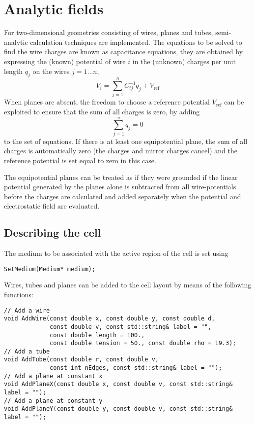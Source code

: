 \section{Analytic fields}

For two-dimensional geometries consisting of wires, planes and tubes, 
semi-analytic calculation techniques are implemented. 
The equations to be solved to find the wire charges are known as 
capacitance equations, they are obtained by expressing the (known) 
potential of wire $i$ in the (unknown) charges per unit length $q_j$ 
on the wires $j = 1 \dots n$,
\begin{equation*}
V_{i} = \sum\limits_{j=1}^{n} C_{ij}^{-1}q_{j} + V_{\text{ref}} 
\end{equation*}
When planes are absent, the freedom to choose a reference potential 
$V_{\text{ref}}$ can be exploited to ensure that the sum of all 
charges is zero, by adding 
\begin{equation*}
\sum\limits_{j=1}^{n} q_{j} = 0
\end{equation*}
to the set of equations.
If there is at least one equipotential plane, the sum of all charges 
is automatically zero (the charges and mirror charges cancel) and 
the reference potential is set equal to zero in this case.

The equipotential planes can be treated as if they were grounded 
if the linear potential generated by the planes alone is subtracted 
from all wire-potentials before the charges are calculated and 
added separately when the potential and electrostatic field are evaluated.

\subsection{Describing the cell}
The medium to be associated with the active region of the cell 
is set using
\begin{lstlisting}
SetMedium(Medium* medium);
\end{lstlisting}
Wires, tubes and planes can be added to the cell layout by means of the 
following functions:
\begin{lstlisting}
// Add a wire
void AddWire(const double x, const double y, const double d,
             const double v, const std::string& label = "", 
             const double length = 100.,
             const double tension = 50., const double rho = 19.3);
// Add a tube
void AddTube(const double r, const double v, 
             const int nEdges, const std::string& label = "");
// Add a plane at constant x
void AddPlaneX(const double x, const double v, const std::string& label = "");
// Add a plane at constant y
void AddPlaneY(const double y, const double v, const std::string& label = "");
\end{lstlisting} 

